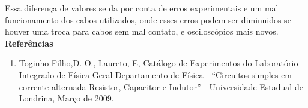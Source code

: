 \documentclass[a4paper, 12pt]{article}
\begin{document}
\begin{multicols}{2}
Essa diferença de valores se da por conta de erros experimentais e um mal funcionamento dos cabos utilizados, onde esses erros podem ser diminuidos se houver uma troca para cabos sem mal contato, e osciloscópios mais novos. \\


\noindent \textbf{\Large Referências}
\begin{enumerate}
\item Toginho Filho,D. O., Laureto, E, Catálogo de Experimentos do Laboratório Integrado de Física Geral Departamento de Física - “Circuitos simples em corrente alternada Resistor, Capacitor e Indutor” - Universidade Estadual de Londrina, Março de 2009.
















\end{enumerate}
\end{multicols}
\end{document}
